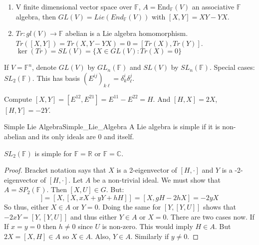 \documentclass[crop=false,class=book,oneside]{standalone}                      %
\begin{document}
        \begin{example}
            \begin{enumerate}
                \item V finite dimensional vector space over $\mathbb{F}$,
                      $A=\textrm{End}_{\mathbb{F}}(V)$ an associative
                      $\mathbb{F}$ algebra, then
                      $GL(V)=Lie(End_{\mathbb{F}}(V))$
                      with $[X,Y]=XY-YX$.
                \item $Tr:gl(V)\rightarrow\mathbb{F}$ abelian is a Lie algebra
                      homomorphism. $Tr([X,Y])=Tr(X,Y-YX)=0=[Tr(X),Tr(Y)]$.
                      $\ker(Tr)=SL(V)=\{X\in{GL}(V):Tr(X)=0\}$
            \end{enumerate}
        \end{example}
        If $V=\mathbb{F}^{n}$, denote $GL(V)$ by $GL_{n}(\mathbb{F})$ and $SL(V)$
        by $SL_{n}(\mathbb{F})$. Special cases: $SL_{2}(\mathbb{F})$. This has basis
        $(E^{ij})_{k\ell}=\delta^{i}_{k}\delta^{j}_{\ell}$.
        \begin{example}
            Compute $[X,Y]=[E^{12},E^{21}]=E^{11}-E^{22}=H$.
            And $[H,X]=2X$, $[H,Y]=\minus{2}Y$.
        \end{example}
        \begin{ldefinition}{Simple Lie Algebra}{Simple_Lie_Algebra}
            A Lie algebra is simple if it is non-abelian and its only ideals are
            $0$ and itself.
        \end{ldefinition}
        \begin{theorem}
            $SL_{2}(\mathbb{F})$ is simple for $\mathbb{F}=\mathbb{R}$ or
            $\mathbb{F}=\mathbb{C}$.
        \end{theorem}
        \begin{proof}
            Bracket notation says that $X$ is a 2-eigenvector of $[H,\cdot]$
            and $Y$ is a -2-eigenvector of $[H,\cdot]$. Let $A$ be a non-trivial
            ideal. We must show that $A=SP_{2}(\mathbb{F})$. Then
            $[X,U]\in{G}$. But:
            \begin{equation}
                [X,[X,U]]=[X,[X,xX+yY+hH]]
                =[X,gH-2hX]=\minus{2}yX
            \end{equation}
            So thus, either $X\in{A}$ or $Y=0$. Doing the same for $[Y,[Y,U]]$ shows
            that $\minus{2}xY=[Y,[Y,U]]$ and thus either $Y\in{A}$ or $X=0$.
            There are two cases now. If If $x=y=0$ then $h\ne{0}$ since $U$ is
            non-zero. This would imply $H\in{A}$. But
            $2X=[X,H]\in{A}$ so $X\in{A}$. Also, $Y\in{A}$. Similarly if $y\ne{0}$.
        \end{proof}
\end{document}
